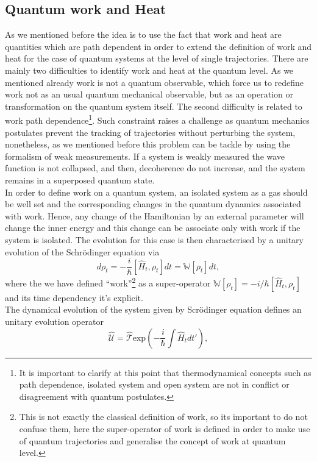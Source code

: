 \subsection{Quantum work and Heat}
As we mentioned before the idea is to use the fact that work and heat are quantities which are path dependent in order to extend the definition of work and heat for the case of quantum systems at the level of single trajectories. There are mainly two difficulties to identify work and heat at the quantum level. As we mentioned already work is not a quantum observable, which force us to redefine work not as an usual quantum mechanical observable, but as an operation or transformation on the quantum system itself. The second difficulty is related to work path dependence\footnote{It is important to clarify at this point that thermodynamical concepts such as path dependence, isolated system and open system are not in conflict or disagreement with quantum postulates. }. Such constraint raises a challenge as quantum mechanics postulates prevent the tracking of trajectories  without perturbing the system, nonetheless, as we mentioned before this problem can be tackle by using the formalism of weak measurements. If a system is weakly measured the wave function is not collapsed, and then, decoherence do not increase, and the system remains in a superposed quantum state.\\
In order to define work on a quantum system, an isolated system as a gas should be well set and the corresponding changes in the quantum dynamics associated with work. Hence, any change of the Hamiltonian by an external parameter will change the inner energy and this change can be associate only with work if the system is isolated. The evolution for this case is then characterised by a unitary evolution of the Schr\"odinger equation via
\begin{equation}
d\rho_t=-\frac{i}{\hbar}[\hat{H}_t,\rho_t]dt=\mathbb{W}[\rho_t]dt,
\label{Work}
\end{equation}
where the we have defined ``work''\footnote{This is not exactly the classical definition of work, so its important to do not confuse them, here the super-operator of work is defined in order to make use of quantum trajectories and generalise the concept of work at quantum level. } as a super-operator $\mathbb{W}[\rho_t]=-i/\hbar [\hat{H}_t,\rho_t]$ and its time dependency it's explicit. \\
The dynamical evolution of the system given by Scr\"odinger equation defines an unitary evolution operator 
\begin{equation}
\hat{\mathcal{U}}=\hat{\mathcal{T}}\text{exp}\left(-\frac{i}{\hbar}\int \hat{H}_t dt'\right),
\label{Unitaryevolution}
\end{equation}
